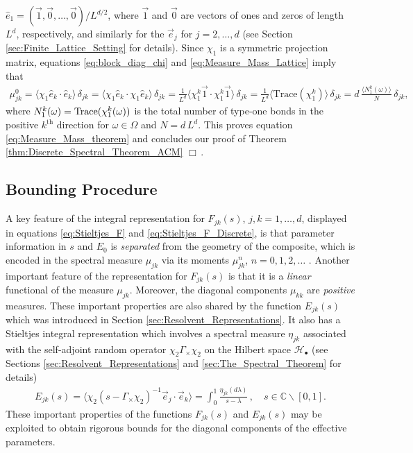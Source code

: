 \documentclass{cmslatex}
\begin{document}
$\hat{e}_1=(\vec{1},\vec{0},\ldots,\vec{0})/L^{d/2}$, where $\vec{1}$ and
$\vec{0}$ are vectors of ones and zeros of length $L^d$, respectively,
and similarly for the $\vec{e}_j$ for $j=2,\ldots,d$ (see Section
\ref{sec:Finite_Lattice_Setting} for details). Since $\chi_1$ is a symmetric
projection matrix, equations \eqref{eq:block_diag_chi} and
\eqref{eq:Measure_Mass_Lattice} imply that
%
\begin{align}\label{eq:Measure_Mass_Lattice_Trace}
  \mu^0_{jk}=\langle\chi_1\hat{e}_k\cdot\hat{e}_k\rangle\,\delta_{jk}
       =\langle\chi_1\hat{e}_k\cdot\chi_1\hat{e}_k\rangle\,\delta_{jk}
       =\frac{1}{L^d}\langle\chi_1^k\vec{1}\cdot \chi_1^k\vec{1}\rangle\,\delta_{jk}
       =\frac{1}{L^d}\langle\text{Trace}(\chi_1^k)\rangle\,\delta_{jk}
       =d\,\frac{\langle N_1^k(\omega)\rangle}{N}\,\delta_{jk},       
\end{align}
%
where $N_1^k(\omega)={\rm Trace}(\chi_1^k(\omega))$ is the total number of type-one
bonds in the positive $k^{\text{th}}$ direction for $\omega\in\Omega$ and
$N=d\,L^d$. This proves equation \eqref{eq:Measure_Mass_theorem} and
concludes our proof of Theorem \ref{thm:Discrete_Spectral_Theorem_ACM}
$\Box\,$.       



\subsection{Bounding Procedure}\label{sec:Bounding_Procedure}
%
A key feature of the integral representation for $F_{jk}(s)$,
$j,k=1,\ldots,d$, displayed in equations \eqref{eq:Stieltjes_F} and
\eqref{eq:Stieltjes_F_Discrete}, is that parameter information in $s$
and $E_0$ is \emph{separated} from the geometry of the composite,
which is encoded in the spectral measure $\mu_{jk}$ via its moments  
$\mu^n_{jk}$, $n=0,1,2,\ldots$ \cite{Bruno:JSP-365,Golden:CMP-473}. Another
important feature of the representation for $F_{jk}(s)$ is that it
is a \emph{linear} functional of the measure $\mu_{jk}$. Moreover, the
diagonal components $\mu_{kk}$ are \emph{positive} measures. These
important properties are also shared by the function $E_{jk}(s)$ which
was introduced in Section \ref{sec:Resolvent_Representations}. It also
has a Stieltjes integral representation which involves a spectral measure
$\eta_{jk}$ associated with the self-adjoint random operator $\chi_2\Gamma_\times\chi_2$
on the Hilbert space $\mathscr{H}_{\bullet}$ (see Sections
\ref{sec:Resolvent_Representations} and \ref{sec:The_Spectral_Theorem}
for details)   
% 
\begin{align}\label{eq:Stieltjes_Es}
  E_{jk}(s)=\langle\chi_2(s-\Gamma_\times\chi_2)^{-1}\vec{e}_j\cdot\vec{e}_k\rangle=\int_0^1\frac{\eta_{jk}(d\lambda)}{s-\lambda}\,,\quad
  s\in\mathbb{C}\backslash[0,1].
\end{align}
%
These important properties of the functions $F_{jk}(s)$ and
$E_{jk}(s)$ may be exploited to obtain rigorous bounds for the
diagonal components of the effective parameters. 
\end{document}
